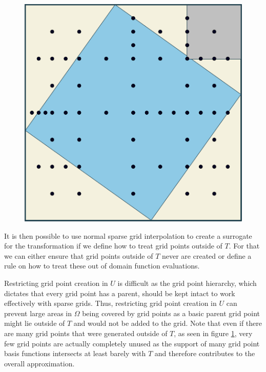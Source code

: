 \documentclass[
  a4paper,  %
  twoside,  %
  bibliography=totoc,
  headsepline,
  cleardoublepage=empty,
  parskip=half,
  draft=false
]{scrbook}
\begin{document}
\begin{mdframed}[style=style]
\begin{figure}[H]
        \centering
\begin{minipage}{.49\textwidth}
        \centering
\label{fig:aligned_grid}
    \end{minipage}%
    \begin{minipage}{0.49\textwidth}
        \centering
   \includegraphics[width=0.8\linewidth]{graphics/aligned_grid}
   \vspace{2mm}
    \end{minipage}
\end{figure}
\end{mdframed}
%
It is then possible to use normal sparse grid interpolation to create a surrogate for the transformation if we define how to treat grid points outside of $T$.
For that we can either ensure that grid points outside of $T$ never are created or define a rule on how to treat these out of domain function evaluations.

Restricting grid point creation in $U$ is difficult as the grid point hierarchy, which dictates that every grid point has a parent, should be kept intact to work effectively with sparse grids.
Thus, restricting grid point creation in $U$ can prevent large areas in $\Omega$ being covered by grid points as a basic parent grid point might lie outside of $T$ and would not be added to the grid.
Note that even if there are many grid points that were generated outside of $T$, as seen in figure \cref{fig:aligned_grid}, very few grid points are actually completely unused as the support of many grid point basis functions intersects at least barely with $T$ and therefore contributes to the overall approximation.
\end{document}
